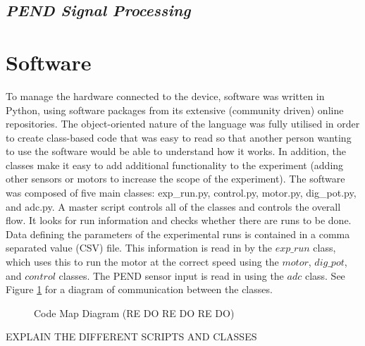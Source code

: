 \documentclass[a4]{report}
\begin{document}
	\subsection{\textit{PEND Signal Processing}}



	\section{Software} %
	To manage the hardware connected to the device, software was written in Python, using software packages from its extensive (community driven) online repositories. The object-oriented nature of the language was fully utilised in order to create class-based code that was easy to read so that another person wanting to use the software would be able to understand how it works. In addition, the classes make it easy to add additional functionality to the experiment (adding other sensors or motors to increase the scope of the experiment). The software was composed of five main classes: exp\_run.py, control.py, motor.py, dig\_pot.py, and adc.py. \newline \newline \noindent
	A master script controls all of the classes and controls the overall flow. It looks for run information and checks whether there are runs to be done. Data defining the parameters of the experimental runs is contained in a comma separated value (CSV) file. This information is read in by the \(exp\_run\) class, which uses this to run the motor at the correct speed using the \(motor\), \(dig\_pot\), and \(control\) classes. The PEND sensor input is read in using the \(adc\) class. See Figure \ref{codemap} for a diagram of communication between the classes. \newline 
	\begin{figure}[!htb]
		\centering
		\caption{Code Map Diagram (RE DO RE DO RE DO)}
		\label{codemap}
	\end{figure}
	EXPLAIN THE DIFFERENT SCRIPTS AND CLASSES
\end{document}
